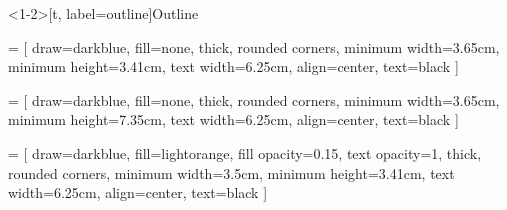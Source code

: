 \documentclass[aspectratio=169]{beamer}
\begin{document}
%

\begin{frame}<1-2>[t, label=outline]{Outline}

   = [
          draw=darkblue,
          fill=none,
          thick,
          rounded corners,
          minimum width=3.65cm,
          minimum height=3.41cm,
          text width=6.25cm,
          align=center,
          text=black
          ]

   = [
          draw=darkblue,
          fill=none,
          thick,
          rounded corners,
          minimum width=3.65cm,
          minimum height=7.35cm,
          text width=6.25cm,
          align=center,
          text=black
          ]

   = [
          draw=darkblue,
          fill=lightorange,
          fill opacity=0.15,
          text opacity=1,
          thick,
          rounded corners,
          minimum width=3.5cm,
          minimum height=3.41cm,
          text width=6.25cm,
          align=center,
          text=black
          ]

  \vspace{6pt}
\end{frame}
\end{document}
